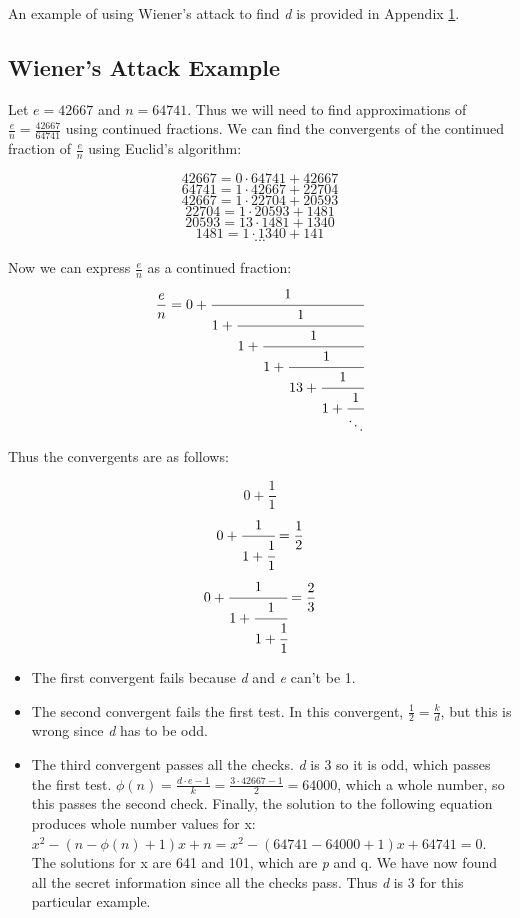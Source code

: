 \documentclass[11pt]{article}
\begin{document}
An example of using Wiener's attack to find \emph{d} is provided in Appendix \ref{appendix:example}.



\begin{appendices}
\section{Wiener's Attack Example}
\label{appendix:example}
Let $ e = 42667 $ and $ n = 64741$. Thus we will need to find approximations of $\frac{e}{n} = \frac{42667}{64741}$ using continued fractions. We can find the convergents of the continued fraction of $\frac{e}{n}$ using Euclid's algorithm:

$$ 42667 = 0 \cdot 64741 + 42667 $$
$$ 64741 = 1 \cdot 42667 + 22704 $$
$$ 42667 = 1 \cdot 22704 + 20593 $$
$$ 22704 = 1 \cdot 20593 + 1481 $$
$$ 20593 = 13 \cdot 1481 + 1340 $$
$$ 1481 = 1 \cdot 1340 + 141 $$
$$ \cdots $$

Now we can express $\frac{e}{n}$ as a continued fraction:
$$\frac{e}{n}= 0 + \cfrac{1}{1+\cfrac{1}{1+\cfrac{1}{1+\cfrac{1}{13+\cfrac{1}{1+\cfrac{1}{\ddots}}}}}}$$

Thus the convergents are as follows:

$$ 0 + \frac{1}{1} $$
$$0+\cfrac{1}{1+\cfrac{1}{1}} = \frac{1}{2}$$
$$0+\cfrac{1}{1+\cfrac{1}{1+\cfrac{1}{1}}} = \frac{2}{3} $$
\begin{itemize}
	\item The first convergent fails because \emph{d} and \emph{e} can't be 1.
	\item The second convergent fails the first test. In this convergent, $\frac{1}{2} = \frac{k}{d}$, but this is wrong since \emph{d} has to be odd.
\item The third convergent passes all the checks. \emph{d} is 3 so it is odd, which passes the first test. $\phi(n) = \frac{ d \cdot e - 1}{k} = \frac{3 \cdot 42667 - 1}{2} = 64000$, which a whole number, so this passes the second check. Finally, the solution to the following equation produces whole number values for x: $ x^2 - (n - \phi(n) + 1)x + n = x^2 - (64741 - 64000 + 1)x + 64741 = 0$. The solutions for x are 641 and 101, which are \emph{p} and {q}. We have now found all the secret information since all the checks pass. Thus \emph{d} is $3$ for this particular example.
\end{itemize}


\end{appendices}
\end{document}
